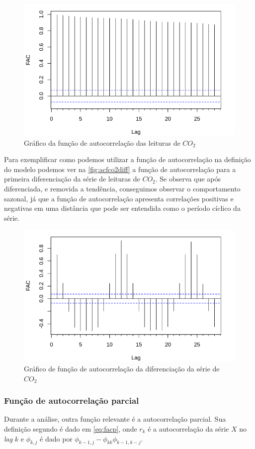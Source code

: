 \documentclass[
    12pt,
    oneside,
    a4paper,
    english,
    brazil
]{abntex2}
\begin{document}
\begin{figure}[ht]
    \centering
    \caption{Gráfico da função de autocorrelação das leituras de
        $CO_2$}\label{fig:correlogramaCo2}
    \includegraphics[width=.5\linewidth]{images/acf_co2.png}
\end{figure}

Para exemplificar como podemos utilizar a função de autocorrelação na definição
do modelo  podemos ver na  \autoref{fig:acfco2diff} a função  de autocorrelação
para a  primeira diferenciação da série  de leituras de $CO_2$.  Se observa que
após diferenciada, e removida a tendência, conseguimos observar o comportamento
sazonal, já  que a função  de autocorrelação apresenta correlações  positivas e
negativas em  uma distância que  pode ser entendida  como o período  cíclico da
série.

\begin{figure}[ht]
    \centering
    \caption{Gráfico de função de autocorrelação da diferenciação da série de
        $CO_2$}\label{fig:acfco2diff}
    \includegraphics[width=.5\linewidth]{images/acf_co2_diff.png}
\end{figure}

\subsubsection{Função de autocorrelação parcial}

Durante  a análise,  outra função  relevante  é a  autocorrelação parcial.  Sua
definição segundo  é dado  em \autoref{eq:facp}, onde $r_k$ é
a autocorrelação  da série $X$  no \textit{lag} $k$  e $\phi_{k,j}$ é  dado por
$\phi_{k-1, j}-\phi_{kk}\phi_{k-1,k-j}$.
\end{document}
